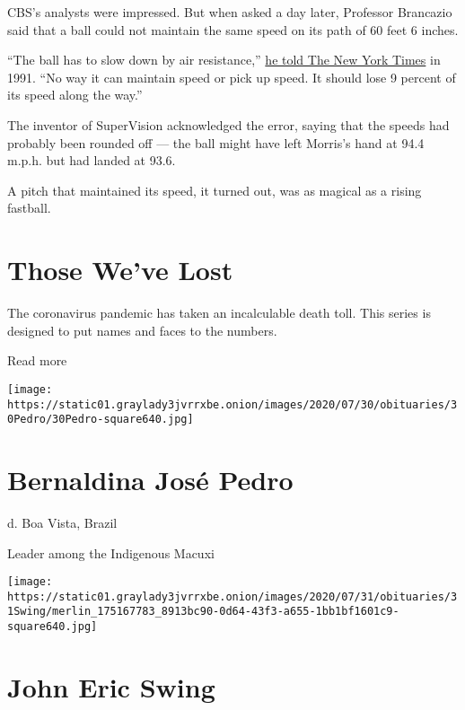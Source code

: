 CBS's analysts were impressed. But when asked a day later, Professor
Brancazio said that a ball could not maintain the same speed on its path
of 60 feet 6 inches.

``The ball has to slow down by air resistance,''
\href{https://www.nytimes3xbfgragh.onion/1991/10/22/sports/tv-sports-the-no-braking-ball-cbs-versus-physics.html}{he
told The New York Times} in 1991. ``No way it can maintain speed or pick
up speed. It should lose 9 percent of its speed along the way.''

The inventor of SuperVision acknowledged the error, saying that the
speeds had probably been rounded off --- the ball might have left
Morris's hand at 94.4 m.p.h. but had landed at 93.6.

A pitch that maintained its speed, it turned out, was as magical as a
rising fastball.

\href{https://www.nytimes3xbfgragh.onion/interactive/2020/obituaries/people-died-coronavirus-obituaries.html?action=click\&pgtype=Article\&state=default\&region=BELOW_MAIN_CONTENT\&context=covid_obits_promo}{}

\hypertarget{those-weve-lost}{%
\section{Those We've Lost}\label{those-weve-lost}}

The coronavirus pandemic has taken an incalculable death toll. This
series is designed to put names and faces to the numbers.

Read more

\texttt{[image: https://static01.graylady3jvrrxbe.onion/images/2020/07/30/obituaries/30Pedro/30Pedro-square640.jpg]}

\hypertarget{bernaldina-josuxe9-pedro}{%
\section{Bernaldina José Pedro}\label{bernaldina-josuxe9-pedro}}

d. Boa Vista, Brazil

Leader among the Indigenous Macuxi

\texttt{[image: https://static01.graylady3jvrrxbe.onion/images/2020/07/31/obituaries/31Swing/merlin\_175167783\_8913bc90-0d64-43f3-a655-1bb1bf1601c9-square640.jpg]}

\hypertarget{john-eric-swing}{%
\section{John Eric Swing}\label{john-eric-swing}}

